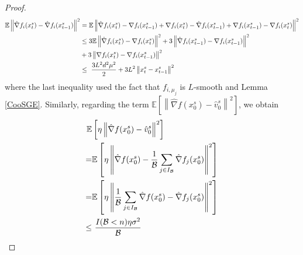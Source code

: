 \documentclass[iicol,sn-basic]{sn-jnl}
\theoremstyle{thmstyleone}%
\theoremstyle{thmstyletwo}%
\theoremstyle{thmstylethree}%
\newcommand*{\E}{\mathbb{E}}
\newcommand{\norm}[1]{\left\lVert#1\right\rVert}
\begin{document}
\begin{proof}
 \begin{align}
 \E \norm{\hat{\nabla} f_i(x_{t}^s)-\hat{\nabla} f_i({x}_{t-1}^s)}^2 &= \E \norm{ \hat{\nabla} f_i(x_{t}^s)-{\nabla} f_i(x_{t-1}^s) + {\nabla} f_i(x_{t}^s)-\hat{\nabla} f_i({x}_{t-1}^s)+{\nabla} f_i({x}_{t-1}^s)-{\nabla} f_i({x}_{t}^s)}^2\\
 &\leq \notag 3 \E \norm{ \hat{\nabla} f_i(x_{t}^s)-{\nabla} f_i(x_{t}^s)}^2 + 3\norm{\hat{\nabla} f_i({x}_{t-1}^s) - {\nabla} f_i({x}_{t-1}^s)}^2\\
 &\notag+ 3\norm{{\nabla} f_i(x_{t}^s) - {\nabla} f_i({x}_{t-1}^s)}^2\\
 &\leq \,\,\label{spider-var-estimate-lem-5}\frac{3 L^2 d^2 \mu^2}{2} + 3L^2 \norm{x_{t}^s-{x}_{t-1}^s}^2
 \end{align}
  where the last inequality used the fact that $f_{i,\mu_j}$ is $L$-smooth  and Lemma \ref{CooSGE}. Similarly, regarding the term  
  $\E\left[\norm{\hat{\nabla} f(x_{0}^s)-{\hat{v}_{0}^s}}^2\right]$, we obtain
  \begin{align}
  \E&\left[\eta\norm{\hat{\nabla} f(x_{0}^s)-{\hat{v}_{0}^s}}^2\right]\notag\\
   =&\E\left[\eta\norm{\hat{\nabla} f(x_{0}^s)-\frac{1}{\mathcal{B}}\sum_{j\in I_{\mathcal{B}}}\hat{\nabla} f_j(x_0^{s})}^2\right]\notag\\
   =&\notag\E\left[\eta\norm{\frac{1}{\mathcal{B}}\sum_{j\in I_{\mathcal{B}}}\hat{\nabla} f(x_0^{s}) - \hat{\nabla} f_j(x_0^{s})}^2\right]\\
   \leq &\,\,\label{spider-var-estimate-lem-6} \frac{I(\mathcal{B} < n)\eta \sigma ^2}{\mathcal{B}}
 \end{align}
 

\end{proof}
\end{document}

